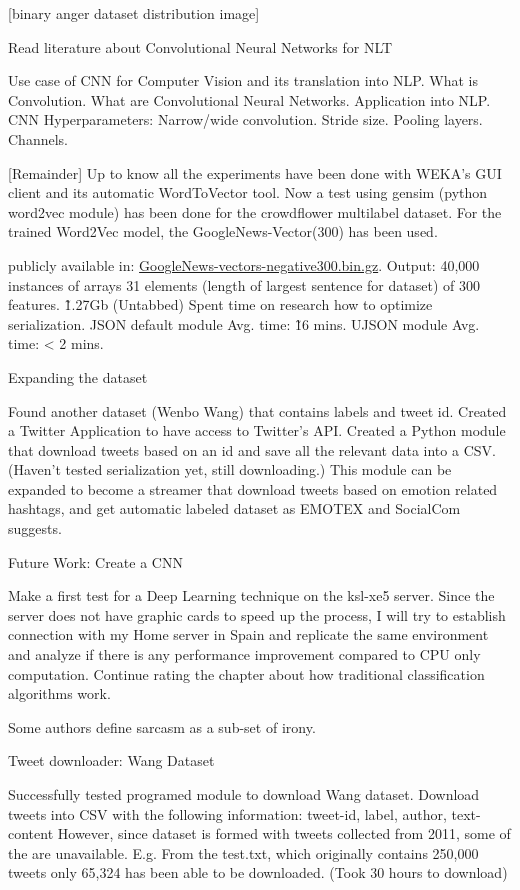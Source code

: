 [binary anger dataset distribution image]

Read literature about Convolutional Neural Networks for NLT\cite{cnnDennyBritz}

Use case of CNN for Computer Vision and its translation into NLP.
What is Convolution.
What are Convolutional Neural Networks.
Application into NLP.
CNN Hyperparameters:
Narrow/wide convolution.
Stride size.
Pooling layers.
Channels.

[Remainder] Up to know all the experiments have been done with WEKA’s GUI client and its automatic WordToVector tool.
Now a test using gensim (python word2vec module) has been done for the crowdflower multilabel dataset.
For the trained Word2Vec model, the GoogleNews-Vector(300)\cite{googleWord2Vec} has been used.

publicly available in: \href{https://drive.google.com/file/d/0B7XkCwpI5KDYNlNUTTlSS21pQmM/edit?usp=sharing}{GoogleNews-vectors-negative300.bin.gz}.
Output: 40,000 instances of arrays 31 elements (length of largest sentence for dataset) of 300 features. \~1.27Gb (Untabbed)
Spent time on research how to optimize serialization.
JSON default module Avg. time: \~ 16 mins.
UJSON module Avg. time: < 2 mins.

Expanding the dataset

Found another dataset (Wenbo Wang) that contains labels and tweet id.
Created a Twitter Application to have access to Twitter’s API.
Created a Python module that download tweets based on an id and save all the relevant data into a CSV. (Haven’t tested serialization yet, still downloading.)
This module can be expanded to become a streamer that download tweets based on emotion related hashtags, and get automatic labeled dataset as EMOTEX and SocialCom suggests.

Future Work: Create a CNN

Make a first test for a Deep Learning technique on the ksl-xe5 server.
Since the server does not have graphic cards to speed up the process, I will try to establish connection with my Home server in Spain and replicate the same environment and analyze if there is any performance improvement compared to CPU only computation.
Continue rating the chapter about how traditional classification algorithms work.

Some authors define sarcasm as a sub-set of irony.

Tweet downloader: Wang Dataset

Successfully tested programed module to download Wang dataset. Download tweets into CSV with the following information:
tweet-id, label, author, text-content
However, since dataset is formed with tweets collected from 2011, some of the are unavailable. E.g. From the test.txt, which originally contains 250,000 tweets only 65,324 has been able to be downloaded. (Took 30 hours to download)

